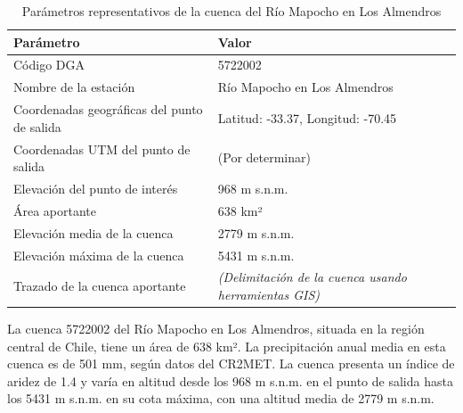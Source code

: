 \documentclass{article} %
\begin{document}
\begin{table}[h!]
\centering
\begin{tabular}{>{\raggedright}p{6cm} p{8cm}}
\toprule
\textbf{Parámetro} & \textbf{Valor} \\
\midrule
Código DGA & 5722002 \\
Nombre de la estación & Río Mapocho en Los Almendros \\
Coordenadas geográficas del punto de salida & Latitud: -33.37, Longitud: -70.45 \\
Coordenadas UTM del punto de salida & (Por determinar) \\
Elevación del punto de interés & 968 m s.n.m. \\
Área aportante & 638 km² \\
Elevación media de la cuenca & 2779 m s.n.m. \\
Elevación máxima de la cuenca & 5431 m s.n.m. \\
Trazado de la cuenca aportante & \textit{(Delimitación de la cuenca usando herramientas GIS)} \\
\bottomrule
\end{tabular}
\caption{Parámetros representativos de la cuenca del Río Mapocho en Los Almendros}
\label{table:parameters}
\end{table}

La cuenca 5722002 del Río Mapocho en Los Almendros, situada en la región central de Chile, tiene un área de 638 km². La precipitación anual media en esta cuenca es de 501 mm, según datos del CR2MET. La cuenca presenta un índice de aridez de 1.4 y varía en altitud desde los 968 m s.n.m. en el punto de salida hasta los 5431 m s.n.m. en su cota máxima, con una altitud media de 2779 m s.n.m.
\end{document}
